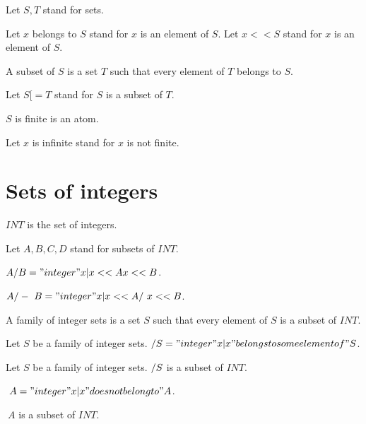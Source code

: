 \documentclass{document}
\begin{document}
  \begin{forthel}

    Let $S,T$ stand for sets.

    Let $x$ belongs to $S$ stand for $x$ is an element of $S$.
    Let $x << S$ stand for $x$ is an element of $S$.

    \begin{definition}[Subset]
      A subset of $S$ is a set $T$ such that every element of $T$ belongs to $S$.
    \end{definition}

    Let $S [= T$ stand for $S$ is a subset of $T$.

    \begin{signature}[FinSet]
      $S$ is finite is an atom.
    \end{signature}

    Let $x$ is infinite stand for $x$ is not finite.
  \end{forthel}


  \section{Sets of integers}

  \begin{forthel}
    \begin{definition}
      $INT$ is the set of integers.
    \end{definition}

    Let $A,B,C,D$ stand for subsets of $INT$.

    \begin{definition}[Union]
      $A \-/ B = { "integer" x | x << A \/ x << B }$.
    \end{definition}

    \begin{definition}[Intersection]
      $A /-\ B = { "integer" x | x << A /\ x << B }$.
    \end{definition}

    \begin{definition}[IntegerSets]
      A family of integer sets is a set $S$ such that every element of $S$ is a subset of $INT$.
    \end{definition}

    \begin{definition}[UnionSet]
      Let $S$ be a family of integer sets. $\-/ S = { "integer" x | x "belongs to some element of" S }$.
    \end{definition}

    \begin{lemma}
      Let $S$ be a family of integer sets. $\-/S$ is a subset of $INT$.
    \end{lemma}

    \begin{definition}[Complement]
      $~ A = { "integer" x | x "does not belong to" A }$.
    \end{definition}

    \begin{lemma}
      $~ A$ is a subset of $INT$.
    \end{lemma}
   \end{forthel}
\end{document}
